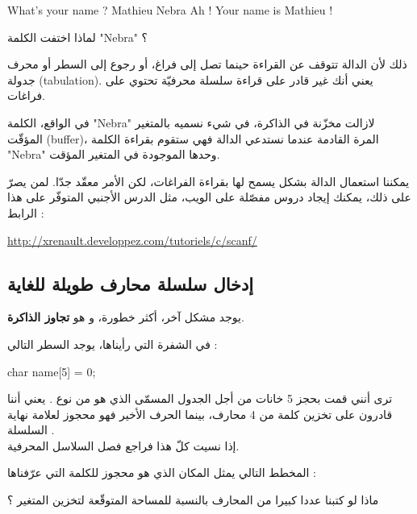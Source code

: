 \begin{Console}
What's your name ? Mathieu Nebra
Ah ! Your name is Mathieu !
\end{Console}

\begin{question}
لماذا اختفت الكلمة
"\textenglish{Nebra}"
؟
\end{question}

ذلك لأن الدالة
تتوقف عن القراءة حينما تصل إلى فراغ، أو رجوع إلى السطر أو محرف جدولة
(\textenglish{tabulation}).
يعني أنك غير قادر على قراءة سلسلة محرفيّة تحتوي على فراغات.

\begin{information}
  في الواقع، الكلمة
  "\textenglish{Nebra}"
  لازالت مخزّنة في الذاكرة، في  شيء نسميه بالمتغير المؤقّت
  (\textenglish{buffer})،
  المرة القادمة عندما نستدعي الدالة
  فهي ستقوم بقراءة الكلمة
  "\textenglish{Nebra}"
    وحدها الموجودة في المتغير المؤقت.
\end{information}

يمكننا استعمال الدالة
بشكل يسمح لها بقراءة الفراغات، لكن الأمر معقّد جدّا. لمن يصرّ على ذلك، يمكنك إيجاد دروس مفصّلة على الويب، مثل الدرس الأجنبي المتوفّر على هذا الرابط :

\url{http://xrenault.developpez.com/tutoriels/c/scanf/}

\subsection{إدخال سلسلة محارف طويلة للغاية}

يوجد مشكل آخر، أكثر خطورة، و هو
\textbf{تجاوز الذاكرة}.

في الشفرة التي رأيناها، يوجد السطر التالي :

\begin{Csource}
char name[5] = {0};
\end{Csource}

ترى أنني قمت بحجز 5 خانات من أجل الجدول المسمّى
الذي هو من نوع
.
يعني أننا قادرون على تخزين كلمة من 4 محارف، بينما الحرف الأخير فهو محجوز لعلامة نهاية السلسلة
.\\
إذا نسيت كلّ هذا فراجع فصل السلاسل المحرفية.

المخطط التالي يمثل المكان الذي هو محجوز للكلمة التي عرّفناها :


ماذا لو كتبنا عددا كبيرا من المحارف بالنسبة للمساحة المتوقّعة لتخزين المتغير ؟

